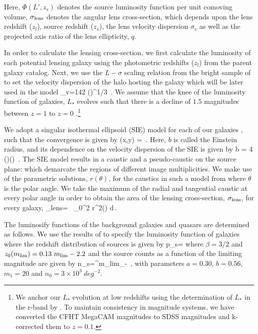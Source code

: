 \documentclass[useAMS,usenatbib,a4paper]{mn2e}
\begin{document}
Here, $\Phi(L',z_s)$ denotes the source luminosity function per unit comoving
volume, $\sigma_{\rm lens}$ denotes the angular lens cross-section, which depends upon
the lens redshift ($z_l$), source redshift ($z_s$), the lens velocity
dispersion $\sigma_v$ as well as the projected axis ratio of the lens
ellipticity, $q$.

In order to calculate the lensing cross-section, we first calculate the
luminosity of each potential lensing galaxy using the photometric redshifts
($z_l$) from the parent galaxy catalog. Next, we use the $L-\sigma$ scaling relation from the
bright sample of \citep{Parker2005} to set the velocity dispersion of the halo
hosting the galaxy which will be later used in the model
\be
\label{magstar2}
\sigma_v=142 \left(\right)^{1/3} \,.
\ee
We assume that the knee of the luminosity function of galaxies, $L_*$ evolves
such that there is a decline of $1.5$ magnitudes between $z=1$ to $z=0$
\citep{Faber2007}.\footnote{We anchor our $L_*$ evolution at low redshifts using the
determination of $L_*$ in the r-band by \citet{Blanton2001}. To maintain
consistency in magnitude systems, we have converted the CFHT MegaCAM magnitudes
to SDSS magnitudes and k-corrected them to $z=0.1$.}

We adopt a singular isothermal ellipsoid (SIE) model for each of our galaxies
\citep{Kormann1994}, such that the convergence is given by
\be
\kappa (x,y) =  \,.
\ee
Here, $b$ is called the Einstein radius, and its dependence on the velocity
dispersion of the SIE is given by
\be
b = 4\pi\,
\left(\right)\left(\right) \,.
\ee
The SIE model results in a caustic and a pseudo-caustic on the source
plane: which demarcate the regions of different image multiplicities. We
make use of the parametric solutions, $r(\theta)$, for the caustics in
such a model from \citet{Keeton2000b} where $\theta$ is the polar angle.
We take the maximum of the radial and tangential caustic at every polar
angle in order to obtain the area of the lensing cross-section,
$\sigma_{\rm lens}$, for every galaxy,
\be
\sigma_{\rm lens}= \, \int_0^{2\pi} r^2(\theta) d\theta \,.
\ee

The luminosify functions of the background galaxies and quasars are
determined as follows. We use the results of \citet{Faure2009} to specify the luminosity
function of galaxies where the redshift distribution of sources is
given by
\be
\label{eqn:ps}
p_s=
\ee
where $\beta=3/2$ and $z_0(m_{\rm lim})=0.13~m_{\rm lim} - 2.2$ and the source
counts as a function of the limiting magnitude are given by
\be
\label{eqn:ns}
n_s=\int^{m_{\rm lim}}_{-\infty} 
\,,
\ee
with parameters $a=0.30$, $b=0.56$, $m_1=20$ and $n_0=3\times10^3~deg^{-2}$.
\end{document}
